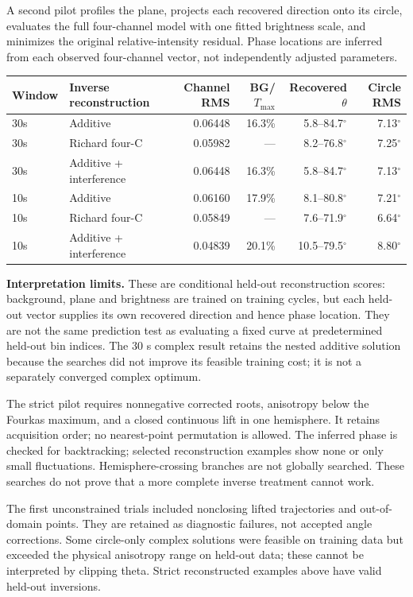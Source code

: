 \documentclass[10pt,a4paper]{article}
\begin{document}
A second pilot profiles the plane, projects each recovered direction onto its circle, evaluates the full four-channel model with one fitted brightness scale, and minimizes the original relative-intensity residual. Phase locations are inferred from each observed four-channel vector, not independently adjusted parameters.

\begin{tabular}{llrrrr}\toprule
Window & Inverse reconstruction & Channel RMS & BG/\(T_{\max}\) & Recovered \(\theta\) & Circle RMS\\\midrule
30s & Additive & 0.06448 & 16.3\% & 5.8--84.7$^\circ$ & 7.13$^\circ$ \\
30s & Richard four-C & 0.05982 & --- & 8.2--76.8$^\circ$ & 7.25$^\circ$ \\
30s & Additive + interference & 0.06448 & 16.3\% & 5.8--84.7$^\circ$ & 7.13$^\circ$ \\
10s & Additive & 0.06160 & 17.9\% & 8.1--80.8$^\circ$ & 7.21$^\circ$ \\
10s & Richard four-C & 0.05849 & --- & 7.6--71.9$^\circ$ & 6.64$^\circ$ \\
10s & Additive + interference & 0.04839 & 20.1\% & 10.5--79.5$^\circ$ & 8.80$^\circ$ \\
\bottomrule\end{tabular}

\textbf{Interpretation limits.} These are conditional held-out reconstruction scores: background, plane and brightness are trained on training cycles, but each held-out vector supplies its own recovered direction and hence phase location. They are not the same prediction test as evaluating a fixed curve at predetermined held-out bin indices. The 30 s complex result retains the nested additive solution because the searches did not improve its feasible training cost; it is not a separately converged complex optimum.

The strict pilot requires nonnegative corrected roots, anisotropy below the Fourkas maximum, and a closed continuous lift in one hemisphere. It retains acquisition order; no nearest-point permutation is allowed. The inferred phase is checked for backtracking; selected reconstruction examples show none or only small fluctuations. Hemisphere-crossing branches are not globally searched. These searches do not prove that a more complete inverse treatment cannot work.

The first unconstrained trials included nonclosing lifted trajectories and out-of-domain points. They are retained as diagnostic failures, not accepted angle corrections. Some circle-only complex solutions were feasible on training data but exceeded the physical anisotropy range on held-out data; these cannot be interpreted by clipping theta. Strict reconstructed examples above have valid held-out inversions.
\end{document}
